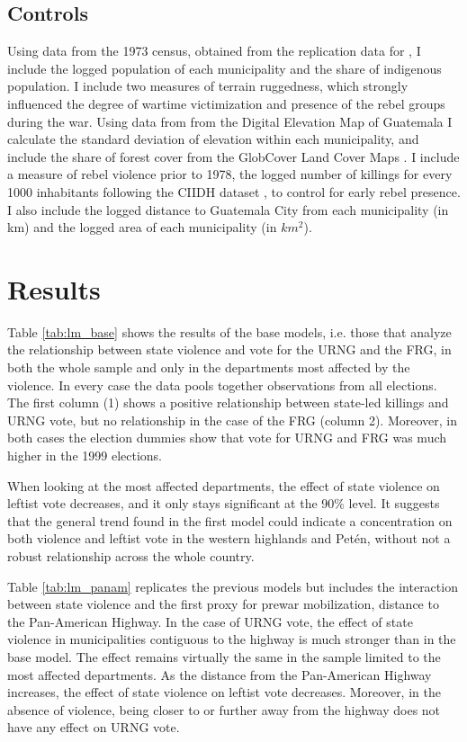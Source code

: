 \documentclass[12pt, notitlepage]{article}
\begin{document}
\subsection*{Controls}

Using data from the 1973 census, obtained from the replication data for \citet{Sullivan:2012aa}, I include the logged population of each municipality and the share of indigenous population.
I include two measures of terrain ruggedness, which strongly influenced the degree of wartime victimization and presence of the rebel groups during the war.
Using data from from the Digital Elevation Map of Guatemala \citep{Mapzen:2018aa} I calculate the standard deviation of elevation within each municipality, and include the share of forest cover from the GlobCover Land Cover Maps \citep{Arino:2012aa}.
I include a measure of rebel violence prior to 1978, the logged number of killings for every 1000 inhabitants following the CIIDH dataset \citep{Ball:1999aa}, to control for early rebel presence.
I also include the logged distance to Guatemala City from each municipality (in km) and the logged area of each municipality (in $km^2$).

\section*{Results}

Table \ref{tab:lm_base} shows the results of the base models, i.e. those that analyze the relationship between state violence and vote for the URNG and the FRG, in both the whole sample and only in the departments most affected by the violence.
In every case the data pools together observations from all elections.
The first column (1) shows a positive relationship between state-led killings and URNG vote, but no relationship in the case of the FRG (column 2).
Moreover, in both cases the election dummies show that vote for URNG and FRG was much higher in the 1999 elections.




When looking at the most affected departments, the effect of state violence on leftist vote decreases, and it only stays significant at the 90\% level.
It suggests that the general trend found in the first model could indicate a concentration on both violence and leftist vote in the western highlands and Petén, without not a robust relationship across the whole country.

Table \ref{tab:lm_panam} replicates the previous models but includes the interaction between state violence and the first proxy for prewar mobilization, distance to the Pan-American Highway.
In the case of URNG vote, the effect of state violence in municipalities contiguous to the highway is much stronger than in the base model.
The effect remains virtually the same in the sample limited to the most affected departments.
As the distance from the Pan-American Highway increases, the effect of state violence on leftist vote decreases.
Moreover, in the absence of violence, being closer to or further away from the highway does not have any effect on URNG vote.
\end{document}
